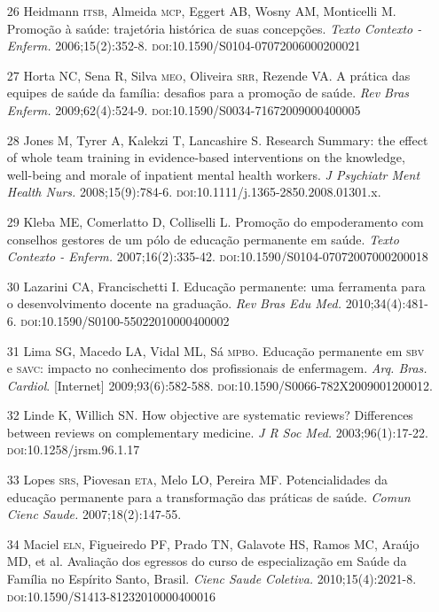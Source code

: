 \documentclass{article}
\begin{document}
\begin{itemize}
\item[26] Heidmann \textsc{itsb}, Almeida \textsc{mcp}, Eggert AB, Wosny AM, Monticelli M.
Promoção à saúde: trajetória histórica de suas concepções. \textit{Texto
Contexto - Enferm.}
2006;15(2):352-8. \textsc{doi}:10.1590/S0104-07072006000200021

\item[27] Horta NC, Sena R, Silva \textsc{meo}, Oliveira \textsc{srr}, Rezende VA. A prática das
equipes de saúde da família: desafios para a promoção de saúde. \textit{Rev Bras
Enferm.}
2009;62(4):524-9. \textsc{doi}:10.1590/S0034-71672009000400005

\item[28] Jones M, Tyrer A, Kalekzi T, Lancashire S. Research Summary: the
effect of whole team training in evidence-based interventions on the knowledge,
well-being and morale of inpatient mental health workers. \textit{J Psychiatr
Ment Health Nurs.}
2008;15(9):784-6. \textsc{doi}:10.1111/j.1365-2850.2008.01301.x.

\item[29] Kleba ME, Comerlatto D, Colliselli L. Promoção do empoderamento com
conselhos gestores de um pólo de educação permanente em saúde. \textit{Texto
Contexto - Enferm.}
2007;16(2):335-42. \textsc{doi}:10.1590/S0104-07072007000200018

\item[30] Lazarini CA, Francischetti I. Educação permanente: uma ferramenta para
o desenvolvimento docente na graduação. \textit{Rev Bras Edu Med.}
2010;34(4):481-6. \textsc{doi}:10.1590/S0100-55022010000400002

\item[31] Lima SG, Macedo LA, Vidal ML, Sá \textsc{mpbo}. Educação permanente em \textsc{sbv} e
\textsc{savc}: impacto no conhecimento dos profissionais de enfermagem. \textit{Arq.
Bras. Cardiol}. [Internet] 2009;93(6):582-588. \textsc{doi}:10.1590/S0066-782X2009001200012.

\item[32] Linde K, Willich SN. How objective are systematic reviews? Differences
between reviews on complementary medicine. \textit{J R Soc Med.}
2003;96(1):17-22. \textsc{doi}:10.1258/jrsm.96.1.17

\item[33] Lopes \textsc{srs}, Piovesan \textsc{eta}, Melo LO, Pereira MF. Potencialidades da
educação permanente para a transformação das práticas de saúde. \textit{Comun
Cienc Saude.}
2007;18(2):147-55.

\item[34] Maciel \textsc{eln}, Figueiredo PF, Prado TN, Galavote HS, Ramos MC, Araújo MD,
et al. Avaliação dos egressos do curso de especialização em Saúde da Família no
Espírito Santo, Brasil. \textit{Cienc Saude Coletiva.}
2010;15(4):2021-8. \textsc{doi}:10.1590/S1413-81232010000400016


\end{itemize}
\end{document}
